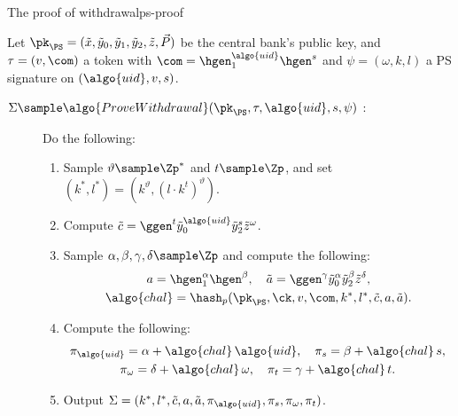 \begin{protocolbox}{The proof of withdrawal}{ps-proof}

  Let $\pk_{\PS} = (\tilde{x}, \tilde{y}_0, \tilde{y}_1, \tilde{y}_2,
\tilde{z}, \vec{P})$ be the central bank's public key, and $\tau = (v, \com)$ a
token with $\com = \hgen_1^{\algo{uid}} \hgen^{s}$ and $\psi = (\omega, k, l)$ a
PS signature on $(\algo{uid}, v, s)$.

  \begin{description}

    \item[$\Sigma \sample \algo{ProveWithdrawal}(\pk_{\PS}, \tau,
\algo{uid}, s, \psi)$ :] Do the following:

      \begin{enumerate}

	\item Sample $\vartheta \sample \Zp^*$ and $t \sample \Zp$, and set
$(k^*, l^*) = (k^{\vartheta}, (l \cdot k^{t})^{\vartheta})$.

	\item Compute $\tilde{c} = \ggen^{t} \tilde{y}_0^{\algo{uid}}
\tilde{y}_2^{s} \tilde{z}^{\omega}$.

	\item Sample $\alpha, \beta, \gamma, \delta \sample \Zp$ and compute
the following:
          \begin{gather*}
            a = \hgen_1^{\alpha} \hgen^{\beta}, \quad \tilde{a} =
\ggen^{\gamma} \tilde{y}_0^{\alpha} \tilde{y}_2^{\beta} \tilde{z}^{\delta},
\\
            \algo{chal} = \hash_p(\pk_{\PS}, \ck, v, \com, k^*, l^*,
\tilde{c}, a, \tilde{a}).
          \end{gather*}

	\item Compute the following:
          \begin{gather*}
            \pi_{\algo{uid}} = \alpha + \algo{chal}\, \algo{uid}, \quad \pi_s =
\beta + \algo{chal}\, s, \\ \pi_\omega = \delta + \algo{chal}\, \omega,
\quad \pi_t = \gamma + \algo{chal}\, t.
          \end{gather*}

	\item Output $\Sigma = (k^*, l^*, \tilde{c}, a, \tilde{a},
\pi_{\algo{uid}}, \pi_s, \pi_\omega, \pi_t)$.

      \end{enumerate}


\end{description}
\end{protocolbox}
